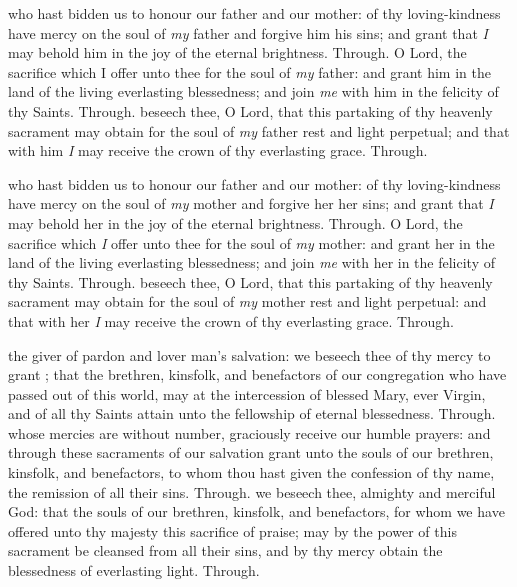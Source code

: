 \begin{multicols}{2}
 who hast bidden us to honour our father and our mother: of thy loving-kindness have mercy on the soul of \textit{my} father and forgive him his sins; and grant that \textit{I} may behold him in the joy of the eternal brightness. Through.
 O Lord, the sacrifice which I offer unto thee for the soul of \textit{my} father: and grant him in the land of the living everlasting blessedness; and join \textit{me} with him in the felicity of thy Saints. Through.
 beseech thee, O Lord, that this partaking of thy heavenly sacrament may obtain for the soul of \textit{my} father rest and light perpetual; and that with him \textit{I} may receive the crown of thy everlasting grace. Through.

 who hast bidden us to honour our father and our mother: of thy loving-kindness have mercy on the soul of \textit{my} mother and forgive her her sins; and grant that \textit{I} may behold her in the joy of the eternal brightness. Through.
 O Lord, the sacrifice which \textit{I} offer unto thee for the soul of \textit{my} mother: and grant her in the land of the living everlasting blessedness; and join \textit{me} with her in the felicity of thy Saints. Through.
 beseech thee, O Lord, that this partaking of thy heavenly sacrament may obtain for the soul of \textit{my} mother rest and light perpetual: and that with her \textit{I} may receive the crown of thy everlasting grace. Through.

 the giver of pardon and lover man's salvation: we beseech thee of thy mercy to grant ;
that the brethren, kinsfolk, and benefactors of our congregation who have passed out of this world, may at the intercession of blessed Mary, ever Virgin, and of all thy Saints attain unto the fellowship of eternal blessedness. Through.
 whose mercies are without number, graciously receive our humble prayers: and through these sacraments of our salvation grant unto the souls of our brethren, kinsfolk, and benefactors, to whom thou hast given the confession of thy name, the remission of all their sins. Through.
 we beseech thee, almighty and merciful God: that the souls of our brethren, kinsfolk, and benefactors, for whom we have offered unto thy majesty this sacrifice of praise; may by the power of this sacrament be cleansed from all their sins, and by thy mercy obtain the blessedness of everlasting light.
Through.


\end{multicols}
